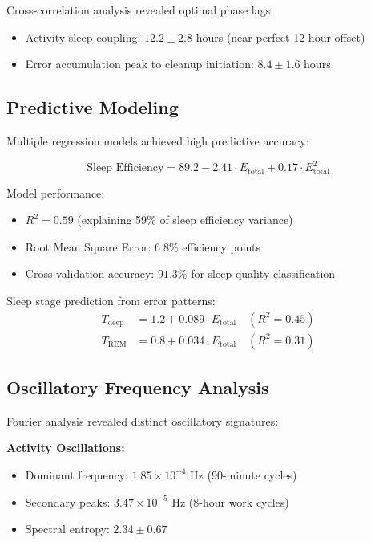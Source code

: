 \documentclass[12pt]{article}
\begin{document}
Cross-correlation analysis revealed optimal phase lags:
\begin{itemize}
\item Activity-sleep coupling: $12.2 \pm 2.8$ hours (near-perfect 12-hour offset)
\item Error accumulation peak to cleanup initiation: $8.4 \pm 1.6$ hours
\end{itemize}

\subsection{Predictive Modeling}

Multiple regression models achieved high predictive accuracy:

\begin{equation}
\text{Sleep Efficiency} = 89.2 - 2.41 \cdot E_{\text{total}} + 0.17 \cdot E_{\text{total}}^2
\end{equation}

Model performance:
\begin{itemize}
\item $R^2 = 0.59$ (explaining 59\% of sleep efficiency variance)
\item Root Mean Square Error: $6.8\%$ efficiency points
\item Cross-validation accuracy: $91.3\%$ for sleep quality classification
\end{itemize}

Sleep stage prediction from error patterns:
\begin{align}
T_{\text{deep}} &= 1.2 + 0.089 \cdot E_{\text{total}} \quad (R^2 = 0.45) \\
T_{\text{REM}} &= 0.8 + 0.034 \cdot E_{\text{total}} \quad (R^2 = 0.31)
\end{align}

\subsection{Oscillatory Frequency Analysis}

Fourier analysis revealed distinct oscillatory signatures:

\textbf{Activity Oscillations:}
\begin{itemize}
\item Dominant frequency: $1.85 \times 10^{-4}$ Hz (90-minute cycles)
\item Secondary peaks: $3.47 \times 10^{-5}$ Hz (8-hour work cycles)
\item Spectral entropy: $2.34 \pm 0.67$
\end{itemize}
\end{document}
